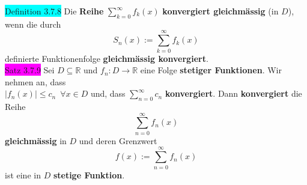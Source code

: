\documentclass[landscape, 10pt]{article}
\newcommand{\R}{\mathbb{R}}
\begin{document}
\begin{multicols}{3}
              \colorbox{cyan}{Definition 3.7.8} 
                     Die \textbf{Reihe}
                     \textcolor{NavyBlue}{
                     $\sum_{k=0}^\infty f_k(x)$}
                     \textbf{konvergiert gleichmässig} 
                     (in \textcolor{NavyBlue}{$D$}), 
                     wenn die durch 
                     \begin{equation*}
                            S_n(x):=\sum_{k=0}^\infty f_k(x)
                     \end{equation*}
                     definierte Funktionenfolge 
                     \textbf{gleichmässig konvergiert}.\\
              \colorbox{magenta}{Satz 3.7.9} 
                     Sei \textcolor{NavyBlue}{$D\subseteq\R$} und 
                     \textcolor{NavyBlue}{
                     $f_n:D\longrightarrow\R$} 
                     eine Folge \textbf{stetiger Funktionen}. 
                     Wir nehmen an, dass \\
                     \textcolor{NavyBlue}{
                     $|f_n(x)|\leqslant c_n
                     \enspace\forall x\in D$}
                     und, dass 
                     \textcolor{NavyBlue}{
                     $\sum_{n=0}^\infty c_n$}
                     \textbf{konvergiert}. 
                     Dann \textbf{konvergiert} die Reihe 
                     \begin{equation*}
                            \sum_{n=0}^\infty f_n(x)
                     \end{equation*}
                     \textbf{gleichmässig} 
                     in \textcolor{NavyBlue}{$D$} und deren Grenzwert
                     \begin{equation*}
                            f(x):=\sum_{n=0}^\infty f_n(x)
                     \end{equation*} 
                     ist eine in 
                     \textcolor{NavyBlue}{$D$} 
                     \textbf{stetige Funktion}.\\


\end{multicols}
\end{document}
